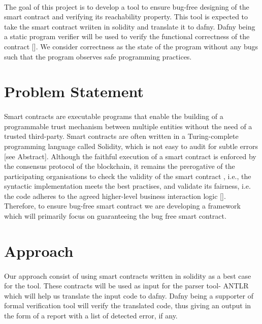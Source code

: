 \documentclass[11pt]{article}
\begin{document}
\paragraph{}
The goal of this project is to develop a tool to ensure bug-free designing of the smart contract and verifying its reachability property. This tool is expected to take the smart contract wriiten in solidity and translate it to dafny. Dafny being a static program verifier will be used to verify the functional correctness of the contract [\cite{DafnyALa19:online}]. We consider correctness as the state of the program without any bugs such that the program observes safe programming practices.

\section{Problem Statement}
\paragraph{}
Smart contracts are executable programs that enable
the building of a programmable trust mechanism between
multiple entities without the need of a trusted third-party. Smart contracts are often written in a Turing-complete programming language called Solidity, which is not easy to audit for subtle errors [see Abstract]\cite{Hardaker2004}. Although the faithful execution of a smart contract is enforced by the consensus protocol of the blockchain, it remains the prerogative of the participating organisations to check the validity of the smart contract , i.e., the syntactic implementation meets the best practises, and validate its fairness, i.e. the code adheres to the agreed higher-level business interaction logic [\cite{kalra2018zeus}]. Therefore, to ensure bug-free smart contract we are developing a framework which will primarily focus on guaranteeing the bug free smart contract.

\section{Approach}
\paragraph{}
Our approach consist of using smart contracts written in solidity as a best case for the tool. These contracts will be used as input for the parser tool- ANTLR which will help us translate the input code to dafny. Dafny being a supporter of formal verification tool will verify the translated code, thus giving an output in the form of a report with a list of detected error, if any. 
\end{document}
